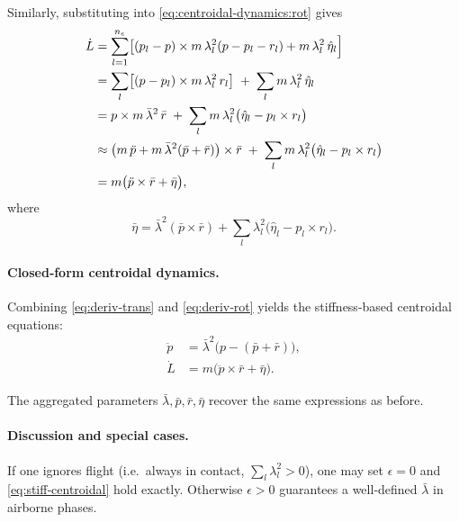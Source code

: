 \documentclass[main.tex]{subfiles}
\begin{document}
Similarly, substituting into \eqref{eq:centroidal‐dynamics:rot} gives
\begin{align}
\dot L
&= \sum_{l=1}^{n_e}\bigl[(p_l - p)\times m\,\lambda_l^2(p - p_l - r_l) + m\,\lambda_l^2\,\hat\eta_l\Bigr]
\notag\\
&= \sum_{l}\bigl[(p - p_l)\times m\,\lambda_l^2\,r_l\bigr]
   \;+\;\sum_{l}m\,\lambda_l^2\,\hat\eta_l
\notag\\
&= p \times m\,\bar\lambda^2\,\bar r
   \;+\;\sum_{l}m\,\lambda_l^2\bigl(\hat\eta_l - p_l\times r_l\bigr)
\notag\\
&\approx \bigl(m\,\ddot p + m\,\bar\lambda^2(\bar p+\bar r)\bigr)\times\bar r
   \;+\;\sum_{l}m\,\lambda_l^2\bigl(\hat\eta_l - p_l\times r_l\bigr)
\notag\\
&= m\bigl(\ddot p\times\bar r + \bar\eta\bigr),
\label{eq:deriv‐rot}
\end{align}
where
\[
\bar\eta
= \bar\lambda^2(\bar p\times\bar r)
  + \sum_{l}\lambda_l^2\bigl(\hat\eta_l - p_l\times r_l\bigr).
\]

\medskip
\paragraph{Closed‐form centroidal dynamics.}
Combining \eqref{eq:deriv‐trans} and \eqref{eq:deriv‐rot} yields the stiffness‐based centroidal equations:
\begin{subequations}\label{eq:stiff‐centroidal}
\begin{align}
\ddot p &= \bar\lambda^2\bigl(p - (\bar p + \bar r)\bigr),
\label{eq:stiff‐centroidal:trans}\\
\dot L &= m\bigl(\ddot p \times \bar r + \bar\eta\bigr).
\label{eq:stiff‐centroidal:rot}
\end{align}
\end{subequations}

\noindent
The aggregated parameters $\bar\lambda,\bar p,\bar r,\bar\eta$ recover the same expressions as before. 

\paragraph{Discussion and special cases.}
\begin{remark}
If one ignores flight (i.e.\ always in contact, $\sum_l\lambda_l^2>0$), one may set $\epsilon=0$ and \eqref{eq:stiff‐centroidal} hold exactly.  Otherwise $\epsilon>0$ guarantees a well‐defined $\bar\lambda$ in airborne phases.
\end{remark}
\end{document}
